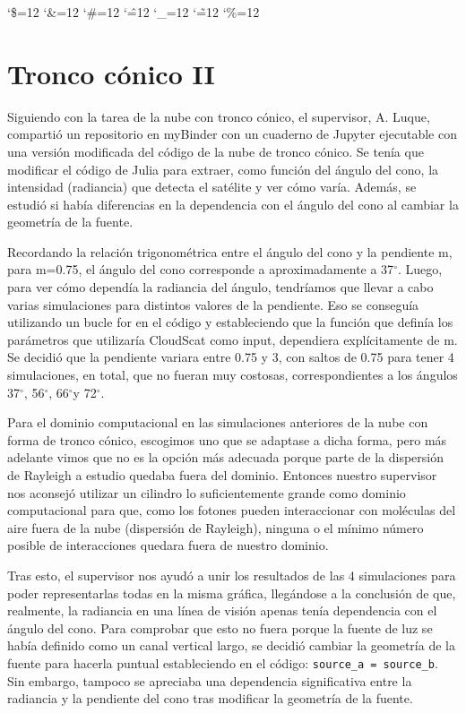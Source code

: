 \documentclass[10pt,letterpaper]{article}
\newcommand{\grad}{$^{\circ}$}
\newenvironment{simplechar}{%
   \catcode`\$=12
   \catcode`\&=12
   \catcode`\#=12
   \catcode`\^=12
   \catcode`\_=12
   \catcode`\~=12
   \catcode`\%=12}{}
\begin{document}
\begin{simplechar}
\section{Tronco cónico II}
Siguiendo con la tarea de la nube con tronco cónico, el supervisor, A. Luque, compartió un repositorio en myBinder con un cuaderno de Jupyter ejecutable con una versión modificada del código de la nube de tronco cónico. Se tenía que modificar el código de Julia para extraer, como función del ángulo del cono, la intensidad (radiancia) que detecta el satélite y ver cómo varía. Además, se estudió si había diferencias en la dependencia con el ángulo del cono al cambiar la geometría de la fuente.

\bigskip
Recordando la relación trigonométrica entre el ángulo del cono y la pendiente m, para m=0.75, el ángulo del cono corresponde a aproximadamente a 37\grad. Luego, para ver cómo dependía la radiancia del ángulo, tendríamos que llevar a cabo varias simulaciones para distintos valores de la pendiente. Eso se conseguía utilizando un bucle for en el código y estableciendo que la función que definía los parámetros que utilizaría CloudScat como input, dependiera explícitamente de m. Se decidió que la pendiente variara entre 0.75 y 3, con saltos de 0.75 para tener 4 simulaciones, en total, que no fueran muy costosas, correspondientes a los ángulos 37\grad, 56\grad, 66\grad y 72\grad.

\bigskip
Para el dominio computacional en las simulaciones anteriores de la nube con forma de tronco cónico, escogimos uno que se adaptase a dicha forma, pero más adelante vimos que no es la opción más adecuada porque parte de la dispersión de Rayleigh a estudio quedaba fuera del dominio. Entonces nuestro supervisor nos aconsejó utilizar un cilindro lo suficientemente grande como dominio computacional para que, como los fotones pueden interaccionar con moléculas del aire fuera de la nube (dispersión de Rayleigh), ninguna o el mínimo número posible de interacciones quedara fuera de nuestro dominio.

\bigskip
Tras esto, el supervisor nos ayudó a unir los resultados de las 4 simulaciones para poder representarlas todas en la misma gráfica, llegándose a la conclusión de que, realmente, la radiancia en una línea de visión apenas tenía dependencia con el ángulo del cono. Para comprobar que esto no fuera porque la fuente de luz se había definido como un canal vertical largo, se decidió cambiar la geometría de la fuente para hacerla puntual estableciendo en el código: \texttt{source_a = source_b}. Sin embargo, tampoco se apreciaba una dependencia significativa entre la radiancia y la pendiente del cono tras modificar la geometría de la fuente.


\end{simplechar}
\end{document}
